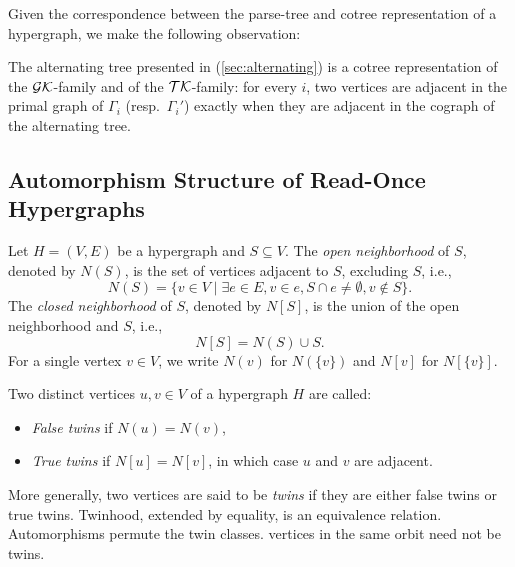 Given the correspondence between the parse-tree and cotree representation of a hypergraph, we make the following observation:

\begin{observation}
The alternating tree presented in \cite{Her04} (\ref{sec:alternating}) is a cotree representation of the $\mathcal{GK}$-family and of the $\mathcal{TK}$-family: for every $i$, two vertices are adjacent in the primal graph of $\Gamma_i$ (resp.\ $\Gamma_i'$) exactly when they are adjacent in the cograph of the alternating tree.
\end{observation}

\subsection{Automorphism Structure of Read-Once Hypergraphs}

\begin{definition}
Let $H=(V,E)$ be a hypergraph and $S\subseteq V$. The \emph{open neighborhood} of $S$, denoted by $N(S)$, is the set of vertices adjacent to $S$, excluding $S$, i.e.,
\[
N(S)=\{v\in V\mid\exists e\in E,v\in e,S\cap e\neq\emptyset,v\notin S\}.
\]
The \emph{closed neighborhood} of $S$, denoted by $N[S]$, is the union of the open neighborhood and $S$, i.e.,
\[
N[S]=N(S)\cup S.
\]
For a single vertex $v\in V$, we write $N(v)$ for $N(\{v\})$ and $N[v]$ for $N[\{v\}]$.
\end{definition}

\begin{definition}
Two distinct vertices $u,v\in V$ of a hypergraph $H$ are called:
\begin{itemize}
\item \emph{False twins} if $N(u)=N(v)$,
\item \emph{True twins} if $N[u]=N[v]$, in which case $u$ and $v$ are adjacent.
\end{itemize}
\end{definition}

More generally, two vertices are said to be \emph{twins} if they are either false twins or true twins. Twinhood, extended by equality, is an equivalence relation. Automorphisms permute the twin classes.   vertices in the same orbit need not be twins.

